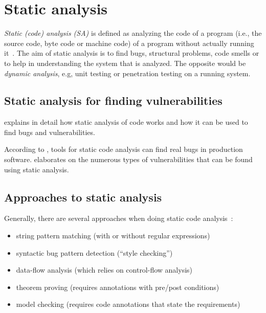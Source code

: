 \chapter{Static analysis}
\label{static-analysis}

\emph{Static (code) analysis (SA)} is defined as analyzing the code of a program (i.e., the source code, byte code or machine code) of a program without actually running it~\cite{chess-west}. The aim of static analysis is to find bugs, structural problems, code smells or to help in understanding the system that is analyzed. The opposite would be \emph{dynamic analysis}, e.g, unit testing or penetration testing on a running system.

\section{Static analysis for finding vulnerabilities}
\cite{chess-west} explains in detail how static analysis of code works and how it can be used to find bugs and vulnerabilities.

According to \cite{findbugs, evaluating}, tools for static code analysis can find real bugs in production software. \cite{coverity-report} elaborates on the numerous types of vulnerabilities that can be found using static analysis.

\section{Approaches to static analysis}
Generally, there are several approaches when doing static code analysis~\cite{comparison-of-bug-finding-tools, swaat, google-code-search}:

\begin{itemize}
 \item string pattern matching (with or without regular expressions)
 \item syntactic bug pattern detection (``style checking'')
 \item data-flow analysis (which relies on control-flow analysis) 
 \item theorem proving (requires annotations with pre/post conditions)
 \item model checking (requires code annotations that state the requirements)
\end{itemize}


